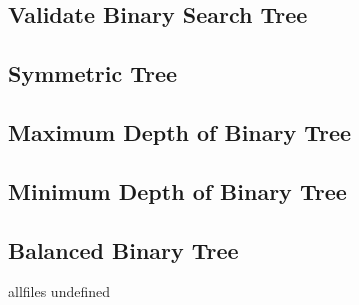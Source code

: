 \documentclass{article}
\begin{document}
\begin{CJK}{UTF8}{gbsn}     %

\else
	
\subsection{Validate Binary Search Tree}

\subsection{Symmetric Tree}

\subsection{Maximum Depth of Binary Tree}

\subsection{Minimum Depth of Binary Tree}

\subsection{Balanced Binary Tree}


\fi

\ifx allfiles undefined
\end{CJK}
\end{document}
